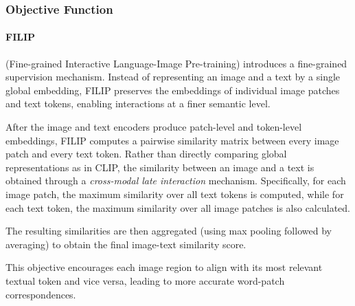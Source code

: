 \subsubsection{Objective Function}

\paragraph{FILIP} (Fine-grained Interactive Language-Image Pre-training) introduces a fine-grained supervision mechanism. 
Instead of representing an image and a text by a single global embedding, FILIP preserves the embeddings of individual image patches 
and text tokens, enabling interactions at a finer semantic level.

After the image and text encoders produce patch-level and token-level embeddings, FILIP computes a pairwise similarity matrix between every image patch and every text token. 
Rather than directly comparing global representations as in CLIP, the similarity between an image and a text is obtained through a \emph{cross-modal late interaction} mechanism. 
Specifically, for each image patch, the maximum similarity over all text tokens is computed, while for each text token, the maximum similarity over all image patches is also calculated. 

The resulting similarities are then aggregated (using max pooling followed by averaging) to obtain the final image-text similarity score.

This objective encourages each image region to align with its most relevant textual token and vice versa, 
leading to more accurate word-patch correspondences.

\paragraph{}


